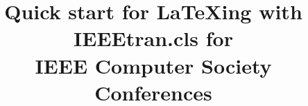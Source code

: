 \documentclass[conference,a4paper]{IEEEtran}[2015/08/26]
\begin{document}

\title{Quick start for LaTeXing with IEEEtran.cls for\\ IEEE Computer Society Conferences}

\author{%
  \and
}


\maketitle

%
%
\iffalse
  \IEEEoverridecommandlockouts
  \IEEEpubid{\begin{minipage}{\textwidth}\ \\[12pt] \centering
      1551-3203 \copyright 2015 IEEE.
      Personal use is permitted, but republication/redistribution requires IEEE permission.
      \\
      See \url{https://www.ieee.org/publications_standards/publications/rights/index.html} for more information.
    \end{minipage}}
\fi

\begin{abstract}
\lipsum[1]
\end{abstract}

%
\IEEEpeerreviewmaketitle
\end{document}
